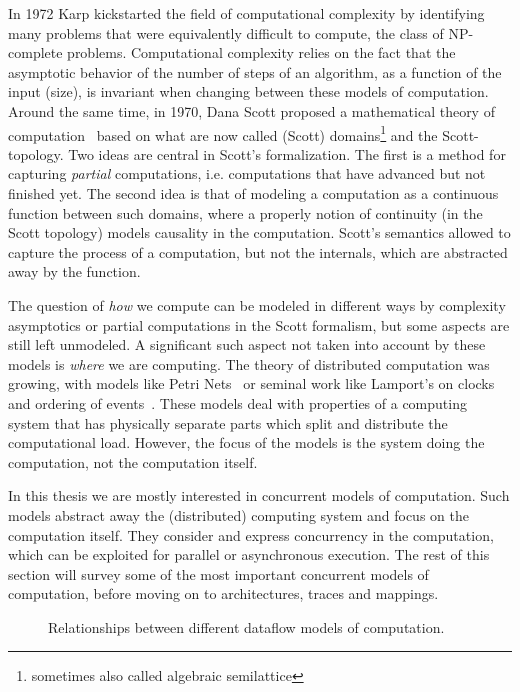 In 1972 Karp\cite{karp1972reducibility} kickstarted the field of computational complexity by identifying many problems that were equivalently difficult to compute, the class of NP-complete problems.
Computational complexity relies on the fact that the asymptotic behavior of the number of steps of an algorithm, as a function of the input (size), is invariant when changing between these models of computation.
Around the same time, in 1970, Dana Scott proposed a mathematical theory of computation~\cite{scott1970} based on what are now called (Scott) domains\footnote{sometimes also called algebraic semilattice} and the Scott-topology. 
Two ideas are central in Scott's formalization. The first is a method for capturing \emph{partial} computations, i.e. computations that have advanced but not finished yet.
The second idea is that of modeling a computation as a continuous function between such domains, where a properly notion of continuity (in the Scott topology) models causality in the computation.
Scott's semantics allowed to capture the process of a computation, but not the internals, which are abstracted away by the function. 

The question of \emph{how} we compute can be modeled in different ways by complexity asymptotics or partial computations in the Scott formalism, but some aspects are still left unmodeled.
A significant such aspect not taken into account by these models is \emph{where} we are computing.
The theory of distributed computation was growing, with models like Petri Nets~\cite{petri1962nets} or seminal work like Lamport's on clocks and ordering of events~\cite{Lamport1978time}.
These models deal with properties of a computing system that has physically separate parts which split and distribute the computational load.
However, the focus of the models is the system doing the computation, not the computation itself.

In this thesis we are mostly interested in concurrent models of computation. 
Such models abstract away the (distributed) computing system and focus on the computation itself. 
They consider and express concurrency in the computation, which can be exploited for parallel or asynchronous execution.
The rest of this section will survey some of the most important concurrent models of computation, before moving on to architectures, traces and mappings.


\begin{figure}[h]
	\centering
   \resizebox{0.55\textwidth}{!}{}
	\caption{Relationships between different dataflow models of computation.}
	\label{fig:dataflow_mocs}
\end{figure}

